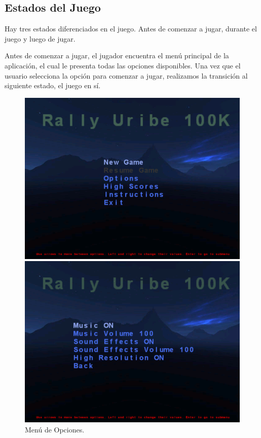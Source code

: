 \documentclass[a4paper,10pt]{article}
\begin{document}
\subsection{Estados del Juego}
Hay tres estados diferenciados en el juego.  Antes de comenzar a jugar, durante
el juego y luego de jugar.

Antes de comenzar a jugar, el jugador encuentra el men\'u principal de la
aplicaci\'on, el cual le presenta todas las opciones disponibles.  Una vez que
el
usuario selecciona la opci\'on para comenzar a jugar, realizamos la transici\'on
al
siguiente estado, el juego en s\'i.

\begin{figure}
\begin{minipage}[b]{0.5\linewidth}
\centering
 \includegraphics[scale=0.250]{./main_menu.png}
 \caption{Men\'u Principal.}
\label{fig:figure0}
\end{minipage}
\hspace{0.5cm}
\begin{minipage}[b]{0.5\linewidth}
\centering
 \includegraphics[scale=0.250]{./options_menu.png}
 \caption{Men\'u de Opciones.}
\label{fig:figure00}
\end{minipage}
\end{figure}
\end{document}

